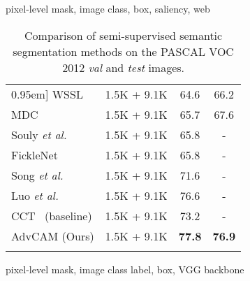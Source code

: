 \documentclass[final]{cvpr}
\begin{document}
\begin{table}[t]
\begin{threeparttable}
\begin{tabular}{l@{\hskip 0.3in}c@{\hskip 0.3in}cc}
    \end{tabular}\begin{tablenotes}
  \footnotesize
\item pixel-level mask, image class, box, saliency, web\\
\scriptsize
\end{tablenotes}
     \end{threeparttable}
\vspace{-1em}

      \end{table} \begin{table}[tbp]
\renewcommand{\arraystretch}{0.95}
  \centering  \caption{Comparison of semi-supervised semantic segmentation methods on the PASCAL VOC 2012 \textit{val} and \textit{test} images.}
\vspace{-0.7em}
\begin{threeparttable}
    \begin{tabular}{l@{\hskip 0.1in}c@{\hskip 0.15in}cc}
    \Xhline{1pt}\-0.95em]
WSSL~\cite{papandreou2015weakly}  & 1.5K  + 9.1K  & 64.6 & 66.2 \\
MDC~\cite{wei2018revisiting}  & 1.5K  + 9.1K  & 65.7 & 67.6\\
    
Souly \textit{et al.}~\cite{souly2017semi} & 1.5K  + 9.1K  &   65.8  & - \\
    FickleNet~\cite{lee2019ficklenet} & 1.5K  + 9.1K  &   65.8  & - \\
    Song \textit{et al.}~\cite{song2019box}& 1.5K  + 9.1K  &   71.6 & -  \\

    
    Luo \textit{et al.}~\cite{luosemi}& 1.5K  + 9.1K  &   76.6 & -  \\
    CCT~\cite{ouali2020semi} (baseline)& 1.5K  + 9.1K   &   73.2 & -  \\
    AdvCAM (Ours) & 1.5K  + 9.1K  &   \textbf{77.8}  &  \textbf{76.9}\\


\Xhline{1pt}
    \end{tabular}\begin{tablenotes}
  \footnotesize
\item pixel-level mask, image class label, box,  VGG backbone \\
\scriptsize
\end{tablenotes}
     \end{threeparttable}
  \label{tabsemi}
\vspace{-1.3em}

\end{table}%
\end{document}
